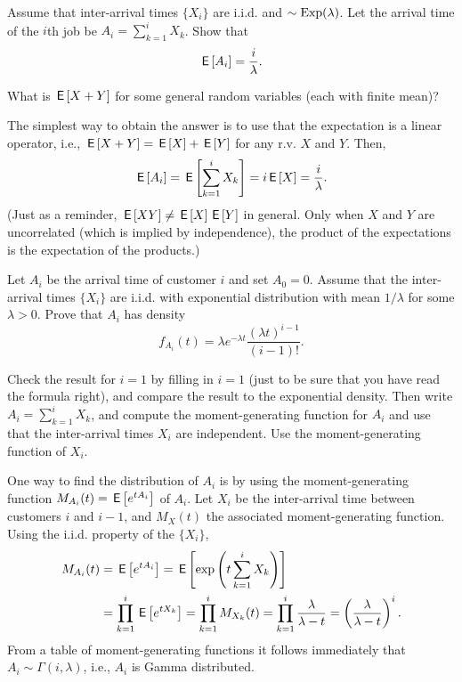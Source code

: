\documentclass[companion]{subfiles}
\begin{document}
\begin{extra}
 Assume that inter-arrival times $\{X_i\}$ are i.i.d. and $\sim\operatorname{Exp}(\lambda)$. Let
the arrival time of the $i$th job be $A_i=\sum_{k=1}^i X_k$. Show that %
 \begin{equation*}
\,\mathsf{E}\left[A_i\right] = \frac i\lambda.
 \end{equation*}
\begin{hint} What is $\,\mathsf{E}\left[X+Y\right]$ for some general random variables (each with finite mean)?
\end{hint}
\begin{solution}
The simplest way to obtain the answer is to use that the expectation is a linear operator, i.e., $\,\mathsf{E}\left[X+Y\right]= \,\mathsf{E}\left[X\right] + \,\mathsf{E}\left[Y\right]$ for any r.v. $X$ and $Y$. Then,
\begin{equation*}
\,\mathsf{E}\left[A_i\right] = \,\mathsf{E}\left[\sum_{k=1}^i X_k\right] = i \,\mathsf{E}\left[X\right] = \frac i \lambda.
\end{equation*}
(Just as a reminder, $\,\mathsf{E}\left[X Y\right] \neq \,\mathsf{E}\left[X\right] \,\mathsf{E}\left[Y\right]$ in general. Only when $X$ and $Y$ are uncorrelated (which is implied by independence), the product of the expectations is the expectation of the products.)

\end{solution}
\end{extra}

\begin{exercise}
 Let $A_i$ be the arrival time of customer $i$ and set $A_0=0$.
 Assume that the inter-arrival times $\{X_i\}$ are i.i.d.
 with exponential distribution with mean $1/\lambda$ for some $\lambda>0$.
 Prove that $A_i$ has density
\begin{equation*}
f_{A_i}(t) = \lambda e^{-\lambda t} \frac{(\lambda t)^{i-1}}{(i-1)!}.
\end{equation*}
\begin{hint}
 Check the result for $i=1$ by filling in $i=1$ (just to be
 sure that you have read the formula right), and compare the result
 to the exponential density. Then write $A_i =\sum_{k=1}^i X_k$, and compute the moment-generating function for $A_i$ and use that the inter-arrival times
 $X_i$ are independent. Use the moment-generating function of $X_i$.
\end{hint}
\begin{solution}
 One way to find the distribution of $A_i$ is by using the moment-generating function $M_{A_i}(t) = \,\mathsf{E}\left[e^{t A_i}\right]$ of $A_i$.
 Let $X_i$ be the inter-arrival time between customers $i$ and $i-1$, and $M_X(t)$ the associated moment-generating function.
 Using the i.i.d.
 property of the $\{X_i\}$,
\begin{align*}
 M_{A_i}(t) &= \,\mathsf{E}\left[e^{t A_i}\right] = \,\mathsf{E}\left[\exp\left(t\sum_{k=1}^{i} X_k\right)\right] \\
& = \prod_{k=1}^{i} \,\mathsf{E}\left[e^{tX_k}\right] = 
\prod_{k=1}^{i} M_{X_k}(t) = 
\prod_{k=1}^{i} \frac{\lambda}{\lambda -t }
 = \left(\frac{\lambda}{\lambda -t }\right)^i.
\end{align*}
From a table of moment-generating functions it follows immediately that
$A_i \sim \Gamma(i,\lambda)$, i.e., $A_i$ is Gamma distributed.
\end{solution}
\end{exercise}
\end{document}
